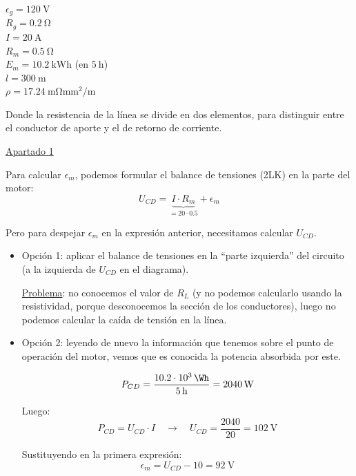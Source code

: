\begin{example}
\begin{minipage}{0.3\linewidth}
  $\epsilon_g = \qty{120}{\volt}$\\
  $R_g = \qty{0.2}{\ohm}$\\
  $I = \qty{20}{\ampere}$\\
  $R_m = \qty{0.5}{\ohm}$\\
  $E_m = \qty{10.2}{\kWh}$ (en $\qty{5}{\hour}$)\\
  $l = \qty{300}{\meter}$\\
  $\rho = \qty{17.24}{\milli\ohm\milli\meter\squared\per\meter}$
\end{minipage}

\vspace{6mm}

Donde la resistencia de la línea se divide en dos elementos, para
distinguir entre el conductor de aporte y el de retorno de corriente.

\vspace{6mm}

\underline{Apartado 1}

\vspace{4mm}

Para calcular $\epsilon_m$, podemos formular el balance de tensiones
(2LK) en la parte del motor:
\[
  U_{CD} = \underbrace{I \cdot R_m}_{= 20 \cdot 0.5} + \epsilon_m
\]

Pero para despejar $\epsilon_m$ en la expresión anterior, necesitamos
calcular $U_{CD}$.
\begin{itemize}
\item Opción 1: aplicar el balance de tensiones en la ``parte
  izquierda'' del circuito (a la izquierda de $U_{CD}$ en el
  diagrama).
    
  \underline{Problema}: no conocemos el valor de $R_L$ (y no podemos
  calcularlo usando la resistividad, porque desconocemos la sección de
  los conductores), luego no podemos calcular la caída de tensión en
  la línea.
    
\item Opción 2: leyendo de nuevo la información que tenemos sobre el
  punto de operación del motor, vemos que es conocida la potencia
  absorbida por este.

    \[
      P_{CD} = \frac{10.2 \cdot 10^{3} \, \si{\Wh}}{\qty{5}{\hour}}
      = \qty{2040}{\watt}
    \]

    Luego:
    \[
      P_{CD} = U_{CD} \cdot I \quad \rightarrow \quad U_{CD} =
      \frac{2040}{20} = \qty{102}{\volt}
    \]

    Sustituyendo en la primera expresión:
    \[
      \epsilon_m = U_{CD} - 10 = \boxed{ \qty{92}{\volt} }
    \]


\end{itemize}
\end{example}
